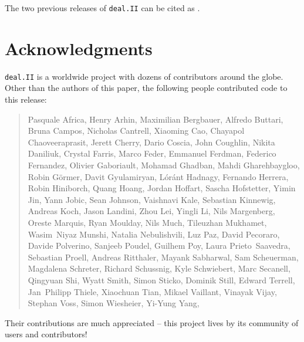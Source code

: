 \documentclass{ansarticle-preprint}
\newcommand{\specialword}[1]{\texttt{#1}}
\newcommand{\dealii}{{\specialword{deal.II}}\xspace}
\begin{document}
The two previous releases of \dealii can be cited as
\cite{dealII95,dealII96}.


\section{Acknowledgments}

\dealii is a worldwide project with dozens of contributors around the
globe. Other than the authors of this paper, the following people
contributed code to this release:\\


\begin{quote}
Pasquale     Africa,
Henry        Arhin,
Maximilian   Bergbauer,
Alfredo      Buttari,
Bruna        Campos,
Nicholas     Cantrell,
Xiaoming     Cao,
Chayapol     Chaoveeraprasit,
Jerett       Cherry,
Dario        Coscia,
John         Coughlin,
Nikita       Daniliuk,
Crystal      Farris,
Marco        Feder,
Emmanuel     Ferdman,
Federico     Fernandez,
Olivier      Gaboriault,
Mohamad      Ghadban,
Mahdi        Gharehbaygloo,
Robin        Görmer,
Davit        Gyulamiryan,
Lóránt       Hadnagy,
Fernando     Herrera,
Robin        Hiniborch,
Quang        Hoang,
Jordan       Hoffart,
Sascha       Hofstetter,
Yimin        Jin,
Yann         Jobic,
Sean         Johnson,
Vaishnavi    Kale,
Sebastian    Kinnewig,
Andreas      Koch,
Jason        Landini,
Zhou         Lei,
Yingli       Li,
Nils         Margenberg,
Oreste       Marquis,
Ryan         Moulday,
Nils         Much,
Tileuzhan    Mukhamet,
Wasim~Niyaz  Munshi,
Natalia      Nebulishvili,
Luz          Paz,
David        Pecoraro,
Davide       Polverino,
Sanjeeb      Poudel,
Guilhem      Poy,
Laura        Prieto~Saavedra,
Sebastian    Proell,
Andreas      Ritthaler,
Mayank       Sabharwal,
Sam          Scheuerman,
Magdalena    Schreter,
Richard      Schussnig,
Kyle         Schwiebert,
Marc         Secanell,
Qingyuan     Shi,
Wyatt        Smith,
Simon        Sticko,
Dominik      Still,
Edward       Terrell,
Jan~Philipp  Thiele,
Xiaochuan    Tian,
Mikael       Vaillant,
Vinayak      Vijay,
Stephan      Voss,
Simon        Wiesheier,
Yi-Yung      Yang,
\end{quote}
Their contributions are much appreciated -- this project lives by its
community of users and contributors!
\end{document}
